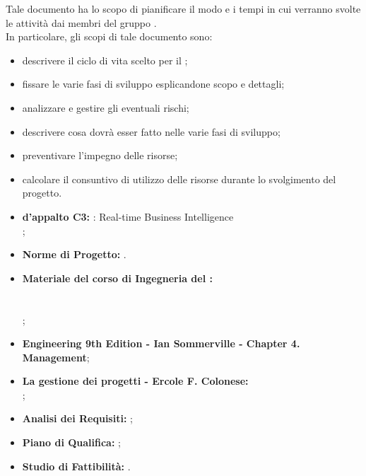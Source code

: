 
		Tale documento ha lo scopo di pianificare il modo e i tempi in cui verranno svolte le attività dai membri del gruppo \groupname{}.\\
		In particolare, gli scopi di tale documento sono:
		\begin{itemize}
			\item descrivere il ciclo di vita scelto per il ;
			\item fissare le varie fasi di sviluppo esplicandone scopo e dettagli;
			\item analizzare e gestire gli eventuali rischi;
			\item descrivere cosa dovrà esser fatto nelle varie fasi di sviluppo;
			\item preventivare l'impegno delle risorse;
			\item calcolare il consuntivo di utilizzo delle risorse durante lo svolgimento del progetto.
		\end{itemize}
	
		

			\begin{itemize}
				\item \textbf{ d'appalto C3:} \projectname{}: Real-time Business Intelligence \\
					;
				\item \textbf{Norme di Progetto:} .
			\end{itemize}
			\begin{itemize}
				\item \textbf{Materiale del corso di Ingegneria del :} \\
					\\
					\\
					;
				\item \textbf{ Engineering 9th Edition - Ian Sommerville - Chapter 4.  Management};
				\item \textbf{La gestione dei progetti  - Ercole F. Colonese:} \\
					;
				\item \textbf{Analisi dei Requisiti:} ;
				\item \textbf{Piano di Qualifica:} ;
				\item \textbf{Studio di Fattibilità:} .
			\end{itemize}
